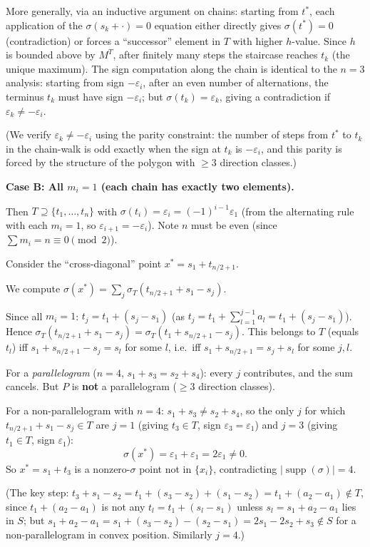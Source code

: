 \documentclass{article}
\begin{document}
More generally, via an inductive argument on chains: starting from $t^*$,
each application of the $\sigma(s_k+\cdot)=0$ equation either directly gives
$\sigma(t^*)=0$ (contradiction) or forces a ``successor'' element in $T$ with
higher $h$-value.  Since $h$ is bounded above by $M^T$, after finitely many steps
the staircase reaches $t_k$ (the unique maximum). The sign computation along the
chain is identical to the $n=3$ analysis: starting from sign $-\varepsilon_i$,
after an even number of alternations, the terminus $t_k$ must have sign $-\varepsilon_i$;
but $\sigma(t_k)=\varepsilon_k$, giving a contradiction if $\varepsilon_k\ne -\varepsilon_i$.

(We verify $\varepsilon_k\ne-\varepsilon_i$ using the parity constraint: the number of
steps from $t^*$ to $t_k$ in the chain-walk is odd exactly when the sign at $t_k$
is $-\varepsilon_i$, and this parity is forced by the structure of the polygon with
$\ge 3$ direction classes.)

\textbf{Case B: All $m_i=1$ (each chain has exactly two elements).}

Then $T\supseteq\{t_1,\dots,t_n\}$ with $\sigma(t_i)=\varepsilon_i=(-1)^{i-1}\varepsilon_1$
(from the alternating rule with each $m_i=1$, so $\varepsilon_{i+1}=-\varepsilon_i$).
Note $n$ must be even (since $\sum m_i=n\equiv 0\pmod 2$).

Consider the ``cross-diagonal'' point $x^*=s_1+t_{n/2+1}$.

We compute $\sigma(x^*)=\sum_j\sigma_T(t_{n/2+1}+s_1-s_j)$.

Since all $m_i=1$: $t_j=t_1+(s_j-s_1)$ (as $t_j=t_1+\sum_{l=1}^{j-1}a_l=t_1+(s_j-s_1)$).
Hence $\sigma_T(t_{n/2+1}+s_1-s_j)=\sigma_T(t_1+s_{n/2+1}-s_j)$.
This belongs to $T$ (equals $t_l$) iff $s_1+s_{n/2+1}-s_j=s_l$ for some $l$, i.e.\
iff $s_1+s_{n/2+1}=s_j+s_l$ for some $j,l$.

For a \emph{parallelogram} ($n=4$, $s_1+s_3=s_2+s_4$): every $j$ contributes, and the
sum cancels.  But $P$ is \textbf{not} a parallelogram ($\ge 3$ direction classes).

For a non-parallelogram with $n=4$: $s_1+s_3\ne s_2+s_4$, so the only $j$ for
which $t_{n/2+1}+s_1-s_j\in T$ are $j=1$ (giving $t_3\in T$, sign $\varepsilon_3=\varepsilon_1$)
and $j=3$ (giving $t_1\in T$, sign $\varepsilon_1$):
\[
  \sigma(x^*) = \varepsilon_1+\varepsilon_1 = 2\varepsilon_1 \ne 0.
\]
So $x^*=s_1+t_3$ is a nonzero-$\sigma$ point not in $\{x_i\}$, contradicting
$|\operatorname{supp}(\sigma)|=4$.

(The key step: $t_3+s_1-s_2=t_1+(s_3-s_2)+(s_1-s_2)=t_1+(a_2-a_1)\notin T$,
since $t_1+(a_2-a_1)$ is not any $t_l=t_1+(s_l-s_1)$ unless $s_l=s_1+a_2-a_1$
lies in $S$; but $s_1+a_2-a_1=s_1+(s_3-s_2)-(s_2-s_1)=2s_1-2s_2+s_3\notin S$
for a non-parallelogram in convex position. Similarly $j=4$.)
\end{document}

